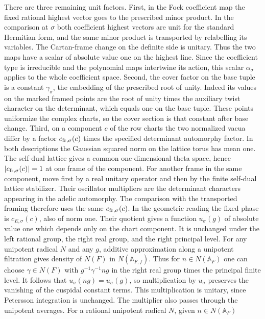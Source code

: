 There are three remaining unit factors. First,
in the Fock coefficient map the fixed rational highest
vector goes to the prescribed minor product. In the
comparison at \(\sigma\) both coefficient highest
vectors are unit for the standard Hermitian form, and
the same minor product is transported by relabelling
its variables. The Cartan-frame change on the definite
side is unitary. Thus the two maps have a scalar of
absolute value one on the highest line. Since the
coefficient type is irreducible and the polynomial
maps intertwine its action, this scalar \(\alpha_\sigma\)
applies to the whole coefficient space. Second, the
cover factor on the base tuple is a constant
\(\gamma_\sigma\), the embedding of the prescribed root
of unity. Indeed its values on the marked framed
points are the root of unity times the auxiliary twist
character on the determinant, which equals one on the
base tuple. These points uniformize the complex charts,
so the cover section is that constant after base
change. Third, on a component \(c\) of the row charts
the two normalized vacua differ by a factor
\(c_{\rm fr,\sigma}(c)\) times the specified determinant
automorphy factor. In both descriptions the Gaussian
squared norm on the lattice torus has mean one. The
self-dual lattice gives a common one-dimensional
theta space, hence \(|c_{\rm fr,\sigma}(c)|=1\) at one
frame of the component. For another frame in the same
component, move first by a real unitary operator and
then by the finite self-dual lattice stabilizer. Their
oscillator multipliers are the determinant characters
appearing in the adelic automorphy. The comparison
with the transported framing therefore uses the same
\(c_{\rm fr,\sigma}(c)\). In the geometric reading the
fixed phase is \(c_{E,\sigma}(c)\), also of norm one.
Their quotient gives a function \(u_\sigma(g)\) of
absolute value one which depends only on the chart
component. It is unchanged under the left rational
group, the right real group, and the right principal
level. For any unipotent radical \(N\) and any \(g\),
additive approximation along a unipotent filtration
gives density of \(N(F)\) in \(N(\mathbb A_{F,f})\).
Thus for \(n\in N(\mathbb A_F)\) one can choose
\(\gamma\in N(F)\) with \(g^{-1}\gamma^{-1}ng\) in the
right real group times the principal finite level.
It follows that \(u_\sigma(ng)=u_\sigma(g)\), so
multiplication by \(u_\sigma\) preserves the vanishing
of the cuspidal constant terms. This multiplication
is unitary, since Petersson integration is unchanged. The multiplier
also passes through the unipotent averages. For a rational
unipotent radical \(N\), given \(n\in N(\mathbb A_F)\)
